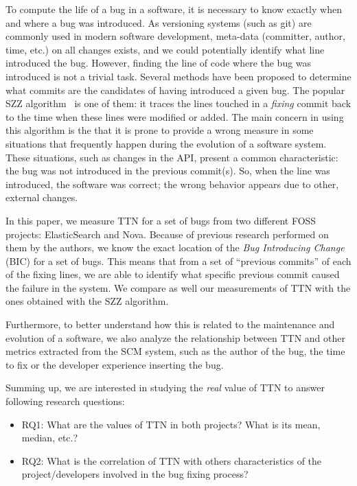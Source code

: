 \documentclass[10pt, conference]{IEEEtran}
\begin{document}
To compute the life of a bug in a software, it is necessary to know exactly when and where a bug was introduced. As versioning systems (such as git) are commonly used in modern software development, meta-data (committer, author, time, etc.) on all changes exists, and we could potentially identify what line introduced the bug. However, finding the line of code where the bug was introduced is not a trivial task. Several methods have been proposed to determine what commits are the candidates of having introduced a given bug. The popular SZZ algorithm~\cite{sliwerski2005changes} is one of them: it traces the lines touched in a \emph{fixing} commit back to the time when these lines were modified or added. The main concern in using this algorithm is the that it is prone to provide a wrong measure in some situations that frequently happen during the evolution of a software system. These situations, such as changes in the API, present a common characteristic: the bug was not introduced in the previous commit(s). So, when the line was introduced, the software was correct; the wrong behavior appears due to other, external changes.


In this paper, we measure TTN for a set of bugs from two different FOSS projects: ElasticSearch and Nova. Because of previous research performed on them by the authors, we know the exact location of the \emph{Bug Introducing Change} (BIC) for a set of bugs. This means that from a set of ``previous commits'' of each of the fixing lines, we are able to identify what specific previous commit caused the failure in the system. We compare as well our measurements of TTN with the ones obtained with the SZZ algorithm.

Furthermore, to better understand how this is related to the maintenance and evolution of a software, we also analyze the relationship between TTN and other metrics extracted from the SCM system, such as the author of the bug, the time to fix or the developer experience inserting the bug.

Summing up, we are interested in studying the \emph{real} value of TTN to answer following research questions:
\begin{itemize}
  \item RQ1: What are the values of TTN in both projects? What is its mean, median, etc.?
  \item RQ2: What is the correlation of TTN with others characteristics of the project/developers involved in the bug fixing process? 
\end{itemize}
\end{document}
